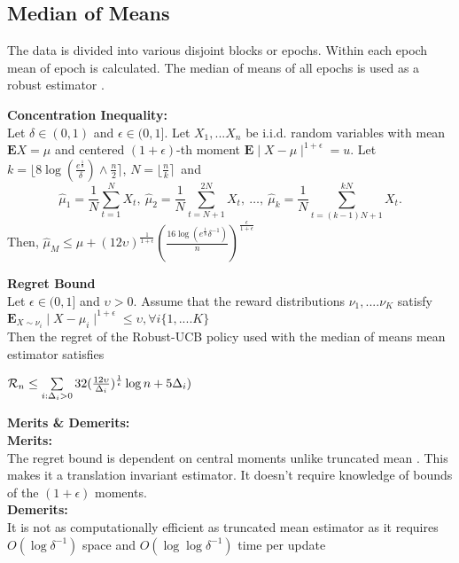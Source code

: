 \documentclass[11pt]{article}
\begin{document}
\subsection{Median of Means}
The data is divided into various disjoint blocks or epochs. Within each epoch mean of epoch is calculated. The median of means of all epochs is used as a robust estimator .\\

\begin{flushleft}
\textbf{Concentration Inequality:}\\
Let $\delta \in (0,1)$ and $\epsilon \in (0,1]$. Let $X_{1},...X_{n}$
be i.i.d. random variables with mean $\mathbf{E}X = \mu$
and centered $(1+\epsilon)$-th  moment $\mathbf{E}\mid X-\mu \mid^{1+\epsilon} = u $.
Let $k = \lfloor 8 \log(\frac {e^{\frac{1}{8}}}{\delta})\wedge \frac{n}{2}\rceil $, $ N =\lfloor \frac{n}{k} \rceil$\
and
$$\hat\mu_{1} = \frac{1}{N}\sum\limits^{N}_{t =1}X_{t},\
\hat\mu_{2} = \frac{1}{N}\sum\limits^{2N}_{t =N+1}X_{t} ,\ \ldots,\ \hat\mu_{k} = \frac{1}{N}\sum\limits^{kN}_{t =(k-1)N+1}X_{t} .$$
Then,
$\hat\mu_{M} \leq \mu  + 
(12\upsilon)^{\frac{1}{1+\epsilon}}(\frac{16\log(e^{\frac{1}{8}}\delta^{-1})}{n})^{\frac{\epsilon}{1+\epsilon}}$ \\
\end{flushleft}
\begin{flushleft}
\textbf{Regret Bound}\\
Let $\epsilon \in (0,1]$ and  $\upsilon > 0$. Assume that the reward distributions $\nu_{1} ,....\nu_{K}$ satisfy \\
$\mathbf{E}_{X\sim\nu_{i}}\mid X-\mu_{i} \mid^{1+\epsilon} \leq \upsilon ,\forall i  \{1,....K\}$\\
Then the regret of the Robust-UCB policy used with the median of means mean estimator satisfies 
\end{flushleft}
$\mathcal{R}_{n} \leq \sum\limits_{i: \Delta_{i} >0} 32(\frac{12\upsilon}{\Delta_{i}})^{\frac{1}{\epsilon}}\log n + 5\Delta_{i})$
\begin{flushleft}
\textbf{Merits \& Demerits:}\\
\textbf{Merits:}\\ The regret bound is dependent on central moments unlike truncated mean . This makes it a translation invariant estimator. It doesn't require knowledge of bounds of the $(1+\epsilon)$ moments.\\
\textbf{Demerits:}\\
It is not as computationally efficient as truncated mean estimator as it requires $O(\log\delta^{-1})$ space and $O(\log\log\delta^{-1})$ time per update
\end{flushleft}
\end{document}
